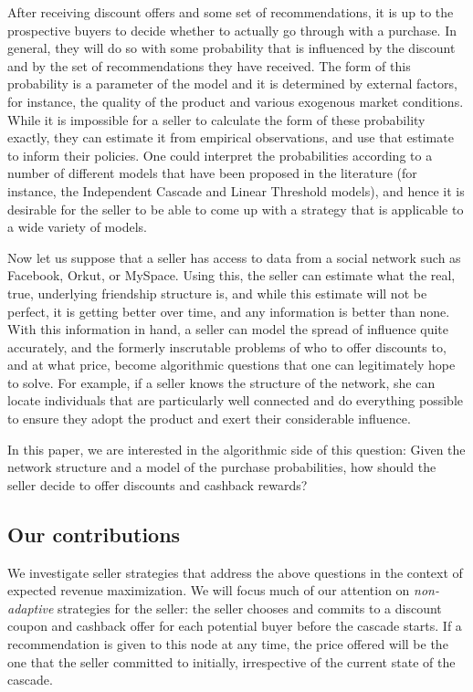 \documentclass[letterpaper,twoside]{article}
\begin{document}
After receiving discount offers and some set of recommendations, it is up to
the prospective buyers to decide whether to actually go through with a
purchase. In general, they will do so with some probability that is
influenced by the discount and by the set of recommendations they have
received. The form of this probability is a parameter of the model and it is
determined by external factors, for instance, the quality of the product and
various exogenous market conditions. While it is impossible for a seller to
calculate the form of these probability exactly, they can estimate it from
empirical observations, and use that estimate to inform their policies. One
could interpret the probabilities according to a number of different models
that have been proposed in the literature (for instance, the Independent
Cascade and Linear Threshold models), and hence it is desirable for the
seller to be able to come up with a strategy that is applicable to a wide
variety of models.

Now let us suppose that a seller has access to data from a social network such as
Facebook, Orkut, or MySpace. Using this, the seller can estimate what the real, true,
underlying friendship structure is, and while this estimate will not be perfect, it is
getting better over time, and any information is better than none. With this information
in hand, a seller can model the spread of influence quite accurately, and the formerly
inscrutable problems of who to offer discounts to, and at what price, become algorithmic
questions that one can legitimately hope to solve. For example, if a seller knows the
structure of the network, she can locate individuals that are particularly well connected
and do everything possible to ensure they adopt the product and exert their considerable influence.

In this paper, we are interested in the algorithmic side of this question: Given the network
structure and a model of the purchase probabilities, how should
the seller decide to offer discounts and cashback rewards?

\subsection{Our contributions}
We investigate seller strategies that address the above questions
in the context of expected revenue maximization. We will focus much of our
attention on {\em non-adaptive} strategies for the seller: the seller chooses and
commits to a discount coupon and cashback offer for each potential buyer before the
cascade starts. If a recommendation is given to this node at any time,
the price offered will be the one that the seller committed to initially, irrespective
of the current state of the cascade.
\end{document}

